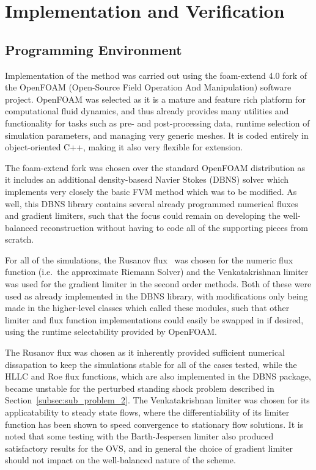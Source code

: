 \chapter{Implementation and Verification}
\label{chap:implementation}

\section{Programming Environment}
\label{sec:environment}

Implementation of the method was carried out using the foam-extend 4.0 fork of the OpenFOAM (Open-Source Field Operation And Manipulation) software project. OpenFOAM was selected as it is a mature and feature rich platform for computational fluid dynamics, and thus already provides many utilities and functionality for tasks such as pre- and post-processing data, runtime selection of simulation parameters, and managing very generic meshes. It is coded entirely in object-oriented C++, making it also very flexible for extension.

The foam-extend fork was chosen over the standard OpenFOAM distribution as it includes an additional density-basesd Navier Stokes (DBNS) solver which implements very closely the basic FVM method which was to be modified. As well, this DBNS library contains several already programmed numerical fluxes and gradient limiters, such that the focus could remain on developing the well-balanced reconstruction without having to code all of the supporting pieces from scratch.

For all of the simulations, the Rusanov flux~\cite{Rusanov1961} was chosen for the numeric flux function (i.e.\ the approximate Riemann Solver) and the Venkatakrishnan limiter~\cite{Venkatakrishnan1993,Venkatakrishnan1995} was used for the gradient limiter in the second order methods. Both of these were used as already implemented in the DBNS library, with modifications only being made in the higher-level classes which called these modules, such that other limiter and flux function implementations could easily be swapped in if desired, using the runtime selectability provided by OpenFOAM.

The Rusanov flux was chosen as it inherently provided sufficient numerical dissapation to keep the simulations stable for all of the cases tested, while the HLLC and Roe flux functions, which are also implemented in the DBNS package, became unstable for the perturbed standing shock problem described in Section~\ref{subsec:sub_problem_2}. The Venkatakrishnan limiter was chosen for its applicatability to steady state flows, where the differentiability of its limiter function has been shown to speed convergence to stationary flow solutions. It is noted that some testing with the Barth-Jespersen limiter also produced satisfactory results for the OVS, and in general the choice of gradient limiter should not impact on the well-balanced nature of the scheme.


